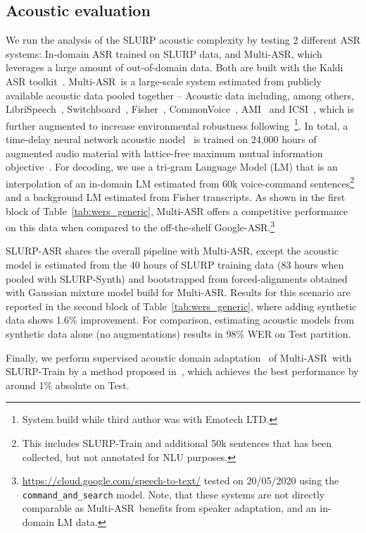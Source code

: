 \documentclass[11pt,a4paper]{article}
\newcommand{\datasetacr}{SLURP}
\newcommand{\asr}{ASR}
\newcommand{\nlu}{NLU}
\newcommand{\wer}{WER}
\newcommand{\masr}{Multi-ASR}
\begin{document}
\subsection{Acoustic evaluation} \label{sec:asr}
We run the analysis of the \datasetacr{}  acoustic complexity by testing 2 different \asr{} systems:
 In-domain ASR trained on \datasetacr{} data, and \masr{}, which leverages a large amount of out-of-domain data.
  Both are built with the Kaldi \asr{} toolkit~\cite{povey2011kaldi}. 
\masr ~is a large-scale system estimated from publicly available acoustic data pooled together -- Acoustic data including, among others, LibriSpeech~\cite{panayotov2015librispeech}, Switchboard~\cite{Godfrey92:switchboard}, Fisher~\cite{cieri2004fisher}, CommonVoice~\cite{ardila2019common}, AMI~\cite{carletta2007unleashing} and ICSI~\cite{janin2003icsi},
which is further augmented to increase environmental robustness following~\cite{ko2017study}\footnote{System build while third author was with Emotech LTD.}. 
In total, a time-delay neural network acoustic model~\cite{peddinti2015time} is trained on 24,000 hours of augmented audio material with lattice-free maximum mutual information objective~\cite{povey2016purely}. For decoding, we use a tri-gram Language Model (LM) that is an interpolation of an in-domain LM estimated from 60k voice-command sentences\footnote{This includes SLURP-Train and additional 50k sentences that has been collected, but not annotated for \nlu{} purposes.} and a background LM estimated from Fisher transcripts. As shown in the first block of Table~\ref{tab:wers_generic}, \masr{} offers a competitive performance on this data when compared to the off-the-shelf Google-ASR.\footnote{\url{https://cloud.google.com/speech-to-text/} tested on 20/05/2020 using the \texttt{command\_and\_search} model. Note, that these systems are not directly comparable as \masr~benefits from speaker adaptation, and an in-domain LM data.}


\datasetacr-ASR shares the overall pipeline with \masr, except the acoustic model is estimated from the 40 hours of \datasetacr{} training data (83 hours when pooled with \datasetacr-Synth) and bootstrapped from forced-alignments obtained with Gaussian mixture model build for \masr. Results for this scenario are reported in the second block of Table~\ref{tab:wers_generic}, where adding synthetic data shows 1.6\% improvement. For comparison, estimating acoustic models from synthetic data alone (no augmentations) results in 98\% \wer{} on Test partition. 

Finally, we perform supervised acoustic domain adaptation~\cite{bell2020adaptation} of \masr~with \datasetacr-Train by a method proposed in~\cite{swietojanski2016learning}, which achieves the best performance by around 1\% absolute on Test.
\end{document}
